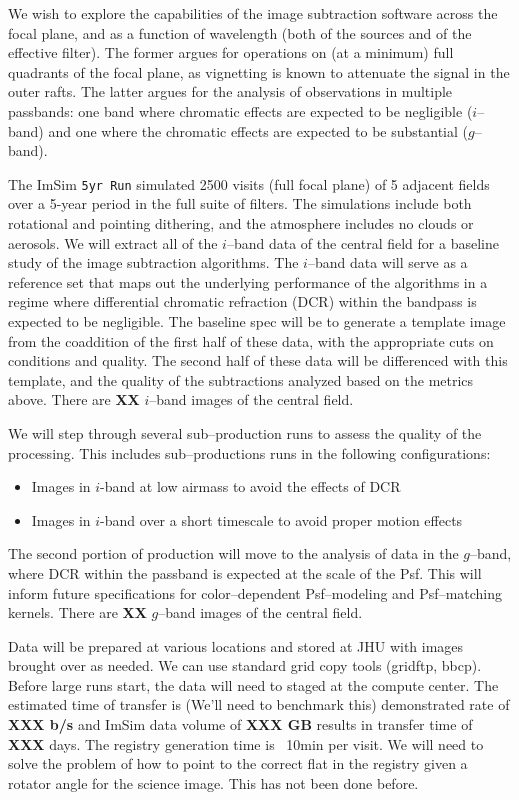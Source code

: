 \documentclass[12pt]{article}
\begin{document}
We wish to explore the capabilities of the image subtraction software
across the focal plane, and as a function of wavelength (both of the
sources and of the effective filter).  The former argues for
operations on (at a minimum) full quadrants of the focal plane, as
vignetting is known to attenuate the signal in the outer rafts.  The
latter argues for the analysis of observations in multiple passbands:
one band where chromatic effects are expected to be negligible
($i$--band) and one where the chromatic effects are expected to be
substantial ($g$--band).

The ImSim {\tt 5yr Run} simulated 2500 visits (full focal plane) of 5
adjacent fields over a 5-year period in the full suite of filters.
The simulations include both rotational and pointing dithering, and
the atmosphere includes no clouds or aerosols.  We will extract all of
the $i$--band data of the central field for a baseline study of the
image subtraction algorithms.  The $i$--band data will serve as a
reference set that maps out the underlying performance of the
algorithms in a regime where differential chromatic refraction (DCR)
within the bandpass is expected to be negligible.  The baseline spec
will be to generate a template image from the coaddition of the first
half of these data, with the appropriate cuts on conditions and
quality.  The second half of these data will be differenced with this
template, and the quality of the subtractions analyzed based on the
metrics above.  There are {\bf XX} $i$--band images of the central
field.

We will step through several sub--production runs to assess the
quality of the processing.  This includes sub--productions runs in the
following configurations:
\begin{itemize}
\item Images in $i$-band at low airmass to avoid the effects of DCR
\item Images in $i$-band over a short timescale to avoid proper motion effects
\end{itemize}

The second portion of production will move to the analysis of data in
the $g$--band, where DCR within the passband is expected at the scale
of the Psf.  This will inform future specifications for
color--dependent Psf--modeling and Psf--matching kernels.  There are
{\bf XX} $g$--band images of the central field.

Data will be prepared at various locations and stored at JHU with
images brought over as needed.  We can use standard grid copy tools
(gridftp, bbcp).  Before large runs start, the data will need to
staged at the compute center.  The estimated time of transfer is
(We'll need to benchmark this) demonstrated rate of {\bf XXX b/s} and
ImSim data volume of {\bf XXX GB} results in transfer time of {\bf
  XXX} days.  The registry generation time is ~10min per visit.  We
will need to solve the problem of how to point to the correct flat in
the registry given a rotator angle for the science image.  This has
not been done before.
\end{document}
